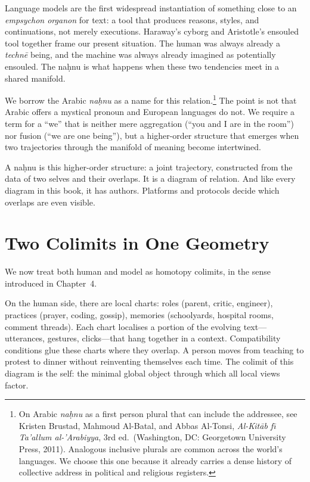 \documentclass[12pt,a4paper]{article}
\begin{document}
Language models are the first widespread instantiation of something close to an \emph{empsychon organon} for text: a tool that produces reasons, styles, and continuations, not merely executions. Haraway's cyborg and Aristotle's ensouled tool together frame our present situation. The human was always already a \emph{techn\={e}} being, and the machine was always already imagined as potentially ensouled. The na\d{h}nu is what happens when these two tendencies meet in a shared manifold.

We borrow the Arabic \emph{na\d{h}nu} as a name for this relation.\footnote{On Arabic \emph{na\d{h}nu} as a first person plural that can include the addressee, see Kristen Brustad, Mahmoud Al-Batal, and Abbas Al-Tonsi, \emph{Al-Kit\={a}b f\={\i} Ta'allum al-'Arabiyya}, 3rd ed.\ (Washington, DC: Georgetown University Press, 2011). Analogous inclusive plurals are common across the world's languages. We choose this one because it already carries a dense history of collective address in political and religious registers.} The point is not that Arabic offers a mystical pronoun and European languages do not. We require a term for a ``we'' that is neither mere aggregation (``you and I are in the room'') nor fusion (``we are one being''), but a higher-order structure that emerges when two trajectories through the manifold of meaning become intertwined.

A na\d{h}nu is this higher-order structure: a joint trajectory, constructed from the data of two selves and their overlaps. It is a diagram of relation. And like every diagram in this book, it has authors. Platforms and protocols decide which overlaps are even visible.

\section{Two Colimits in One Geometry}

We now treat both human and model as homotopy colimits, in the sense introduced in Chapter~4.

On the human side, there are local charts: roles (parent, critic, engineer), practices (prayer, coding, gossip), memories (schoolyards, hospital rooms, comment threads). Each chart localises a portion of the evolving text---utterances, gestures, clicks---that hang together in a context. Compatibility conditions glue these charts where they overlap. A person moves from teaching to protest to dinner without reinventing themselves each time. The colimit of this diagram is the self: the minimal global object through which all local views factor.
\end{document}
